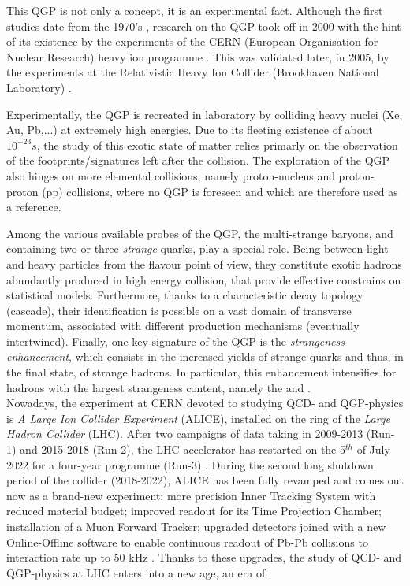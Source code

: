This QGP is not only a concept, it is an experimental fact. Although the first studies date from the 1970's \cite{carruthersQuarkiumBizarreFermi1974}\cite{harringtonHighDensityPhaseTransitions1974}\cite{collinsSuperdenseMatterNeutrons1975}, research on the QGP took off in 2000 with the hint of its existence by the experiments of the CERN (European Organisation for Nuclear Research) heavy ion programme \cite{NewStateMatter2023}. This was validated later, in 2005, by the experiments at the Relativistic Heavy Ion Collider (Brookhaven National Laboratory) \cite{ludlamHUNTINGQUARKGLUON2005}\cite{arseneQuarkGluonPlasma2005}\cite{alPHOBOSPerspectiveDiscoveries2005}\cite{phenixcollaborationFormationDensePartonic2005}\cite{starcollaborationExperimentalTheoreticalChallenges2005}.

Experimentally, the QGP is recreated in laboratory by colliding heavy nuclei (Xe, Au, Pb,...) at extremely high energies. Due to its fleeting existence of about $10^{-23} s$, the study of this exotic state of matter relies primarly on the observation of the footprints/signatures left after the collision. The exploration of the QGP also hinges on more elemental collisions, namely proton-nucleus and proton-proton (pp) collisions, where no QGP is foreseen and which are therefore used as a reference. 

Among the various available probes of the QGP, the multi-strange baryons, \rmXi and \rmOmega containing two or three \textit{strange} quarks, play a special role. Being between light and heavy particles from the flavour point of view, they constitute exotic hadrons abundantly produced in high energy collision, that provide effective constrains on statistical models. Furthermore, thanks to a characteristic decay topology (cascade), their identification is possible on a vast domain of transverse momentum, associated with different production mechanisms (eventually intertwined). Finally, one key signature of the QGP is the \textit{strangeness enhancement}, which consists in the increased yields of strange quarks and thus, in the final state, of strange hadrons. In particular, this enhancement intensifies for hadrons with the largest strangeness content, namely the \rmXi and \rmOmega.\\

Nowadays, the experiment at CERN devoted to studying QCD- and QGP-physics is \textit{A Large Ion Collider Experiment} (ALICE), installed on the ring of the \textit{Large Hadron Collider} (LHC). After two campaigns of data taking in 2009-2013 (Run-1) and 2015-2018 (Run-2), the LHC accelerator has restarted on the 5$^{th}$ of July 2022 for a four-year programme (Run-3) \cite{ThirdRunLarge2023}. During the second long shutdown period of the collider (2018-2022), ALICE has been fully revamped and comes out now as a brand-new experiment: more precision Inner Tracking System with reduced material budget; improved readout for its Time Projection Chamber; installation of a Muon Forward Tracker; upgraded detectors joined with a new Online-Offline software to enable continuous readout of Pb-Pb collisions to interaction rate up to 50 kHz \cite{alicecollaborationUpgradeALICEExperiment2014}. Thanks to these upgrades, the study of QCD- and QGP-physics at LHC enters into a new age, an era of .

